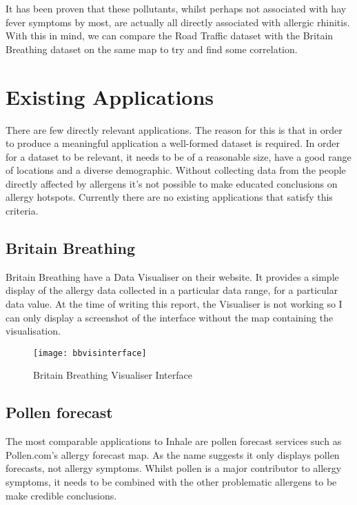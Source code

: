 It has been proven that these pollutants, whilst perhaps not associated with hay fever symptoms by most, are actually all directly associated with allergic rhinitis\cite{airPollution}. With this in mind, we can compare the Road Traffic dataset with the Britain Breathing dataset on the same map to try and find some correlation.\\

\section{Existing Applications}
\label{sec:diagrams}

There are few directly relevant applications. The reason for this is that in order to produce a meaningful application a well-formed dataset is required. In order for a dataset to be relevant, it needs to be of a reasonable size, have a good range of locations and a diverse demographic. Without collecting data from the people directly affected by allergens it's not possible to make educated conclusions on allergy hotspots. Currently there are no existing applications that satisfy this criteria.\\

\subsection{Britain Breathing}
Britain Breathing have a Data Visualiser on their website. It provides a simple display of the allergy data collected in a particular data range, for a particular data value. At the time of writing this report, the Visualiser is not working so I can only display a screenshot of the interface without the map containing the visualisation.

\begin{figure}[H]
\begin{center}
\texttt{[image: bbvisinterface]}
\caption{Britain Breathing Visualiser Interface}
\end{center}
\end{figure}

\subsection{Pollen forecast}

The most comparable applications to Inhale are pollen forecast services such as Pollen.com's allergy forecast map. As the name suggests it only displays pollen forecasts, not allergy symptoms. Whilst pollen is a major contributor to allergy symptoms, it needs to be combined with the other problematic allergens to be make credible conclusions.\\

